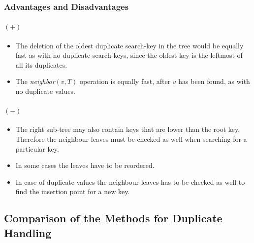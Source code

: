 \documentclass[abstracton,12pt]{scrreprt}
\begin{document}
\subsubsection{Advantages and Disadvantages}
\paragraph{$(+)$}
\begin{itemize}  
	\item  The deletion of the oldest duplicate search-key in the tree would be equally fast as with no duplicate search-keys, since the oldest key is the leftmost of all its duplicates. 
	\item  The \emph{neighbor}$(v,T)$ operation is equally fast, after $v$ has been found, as with no duplicate values. 
\end{itemize}
\paragraph{$(-)$}
\begin{itemize}  
	\item  The right sub-tree may also contain keys that are lower than the root key. Therefore the neighbour leaves must be checked as well when searching for a particular key. 
	\item In some cases the leaves have to be reordered.
	\item In case of duplicate values the neighbour leaves has to be checked as well to find the insertion point for a new key.
\end{itemize}


\subsection{Comparison of the Methods for Duplicate Handling}
\end{document}
